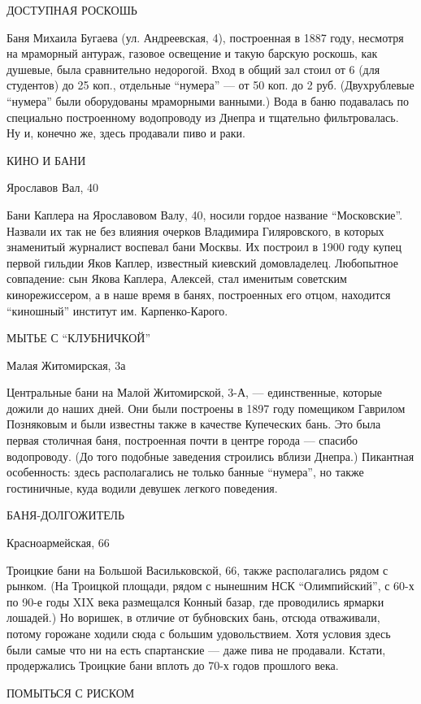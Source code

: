 ДОСТУПНАЯ РОСКОШЬ

Баня Михаила Бугаева (ул. Андреевская, 4), построенная в 1887 году, несмотря на
мраморный антураж, газовое освещение и такую барскую роскошь, как душевые, была
сравнительно недорогой. Вход в общий зал стоил от 6 (для студентов) до 25 коп.,
отдельные \enquote{нумера} — от 50 коп. до 2 руб. (Двухрублевые \enquote{нумера} были
оборудованы мраморными ванными.) Вода в баню подавалась по специально
построенному водопроводу из Днепра и тщательно фильтровалась. Ну и, конечно же,
здесь продавали пиво и раки.

КИНО И БАНИ

Ярославов Вал, 40

Бани Каплера на Ярославовом Валу, 40, носили гордое название
\enquote{Московские}.  Назвали их так не без влияния очерков Владимира
Гиляровского, в которых знаменитый журналист воспевал бани Москвы. Их построил
в 1900 году купец первой гильдии Яков Каплер, известный киевский домовладелец.
Любопытное совпадение: сын Якова Каплера, Алексей, стал именитым советским
кинорежиссером, а в наше время в банях, построенных его отцом, находится
\enquote{киношный} институт им.  Карпенко-Карого.

МЫТЬЕ С \enquote{КЛУБНИЧКОЙ}

Малая Житомирская, 3а

Центральные бани на Малой Житомирской, 3-А, — единственные, которые дожили до
наших дней. Они были построены в 1897 году помещиком Гаврилом Позняковым и были
известны также в качестве Купеческих бань. Это была первая столичная баня,
построенная почти в центре города — спасибо водопроводу. (До того подобные
заведения строились вблизи Днепра.) Пикантная особенность: здесь располагались
не только банные \enquote{нумера}, но также гостиничные, куда водили девушек легкого
поведения.

БАНЯ-ДОЛГОЖИТЕЛЬ

Красноармейская, 66

Троицкие бани на Большой Васильковской, 66, также располагались рядом с рынком.
(На Троицкой площади, рядом с нынешним НСК \enquote{Олимпийский}, с 60-х по
90-е годы XIX века размещался Конный базар, где проводились ярмарки лошадей.)
Но воришек, в отличие от бубновских бань, отсюда отваживали, потому горожане
ходили сюда с большим удовольствием. Хотя условия здесь были самые что ни на
есть спартанские — даже пива не продавали. Кстати, продержались Троицкие бани
вплоть до 70-х годов прошлого века.

ПОМЫТЬСЯ С РИСКОМ

